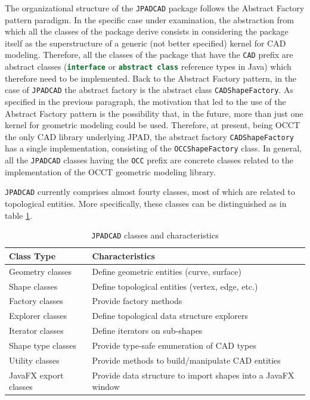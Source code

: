 The organizational structure of the \lstinline[language=Java]!JPADCAD! package follows the Abstract Factory pattern paradigm. In the specific case under examination, the abstraction from which all the classes of the package derive consists in considering the package itself as the superstructure of a generic (not better specified) kernel for \gls{CAD} modeling. Therefore, all the classes of the package that have the \lstinline[language=Java]!CAD! prefix are abstract classes (\lstinline[language=Java]!interface! or \lstinline[language=Java]!abstract class! reference types in Java) which therefore need to be implemented. Back to the Abstract Factory pattern, in the case of \lstinline[language=Java]!JPADCAD! the abstract factory is the abstract class \lstinline[language=Java]!CADShapeFactory!. As specified in the previous paragraph, the motivation that led to the use of the Abstract Factory pattern is the possibility that, in the future, more than just one kernel for geometric modeling could be used. Therefore, at present, being \gls{OCCT} the only \gls{CAD} library underlying \gls{JPAD}, the abstract factory \lstinline[language=Java]!CADShapeFactory! has a single implementation, consisting of the \lstinline[language=Java]!OCCShapeFactory! class. In general, all the \lstinline[language=Java]!JPADCAD! classes having the \lstinline[language=Java]!OCC! prefix are concrete classes related to the implementation of the \gls{OCCT} geometric modeling library.

\bigskip
\noindent
\lstinline[language=Java]!JPADCAD! currently comprises almost fourty classes, most of which are related to topological entities. More specifically, these classes can be distinguished as in table \ref{tab:JPADCADclasses}. 
%
\bigskip
\begin{table}[H]
\centering
\begin{tabular}{p{4.0cm}p{10.5cm}}
\toprule
\textbf{Class Type} & \textbf{Characteristics} \\
\midrule
Geometry classes & Define geometric entities (curve, surface) \\[0.5cm]
Shape classes & Define topological entities (vertex, edge, etc.) \\[0.5cm]
Factory classes & Provide factory methods \\[0.5cm]
Explorer classes & Define topological data structure explorers \\[0.5cm]
Iterator classes & Define iterators on sub-shapes \\[0.5cm]
Shape type classes & Provide type-safe enumeration of CAD types \\[0.5cm]
Utility classes & Provide methods to build/manipulate CAD entities \\[0.5cm]
JavaFX export classes & Provide data structure to import shapes into a JavaFX window \\
\bottomrule
\end{tabular}
\caption{\lstinline[language=Java]!JPADCAD! classes and characteristics}
\label{tab:JPADCADclasses}
\end{table}
%

